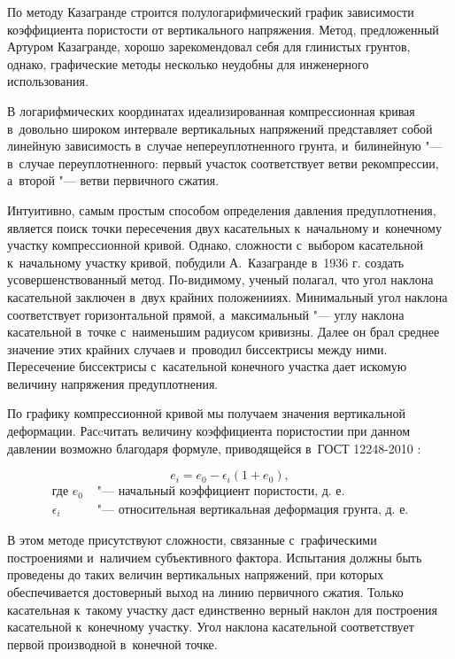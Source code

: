 По методу Казагранде строится полулогарифмический график зависимости коэффициента пористости от вертикального напряжения.  
Метод, предложенный Артуром Казагранде, хорошо зарекомендовал себя для глинистых грунтов, однако, графические методы несколько неудобны для инженерного использования.

В логарифмических координатах идеализированная компрессионная кривая в~довольно широком интервале вертикальных напряжений представляет собой линейную зависимость в~случае непереуплотненного грунта, и~билинейную "--- в~случае переуплотненного:
первый участок соответствует ветви рекомпрессии, а~второй "--- ветви первичного сжатия.

Интуитивно, самым простым способом определения давления предуплотнения, является поиск точки пересечения двух касательных к~начальному и~конечному участку компрессионной кривой. 
Однако, сложности с~выбором касательной к~начальному участку кривой, побудили А.~Казагранде в~1936 г. создать усовершенствованный метод. 
По-видимому, ученый полагал, что угол наклона касательной заключен в~двух крайних положенииях. 
Минимальный угол наклона соответствует горизонтальной прямой, а~максимальный "--- углу наклона касательной в~точке с~наименьшим радиусом кривизны. 
Далее он брал среднее значение этих крайних случаев и~проводил биссектрисы между ними. 
Пересечение биссектрисы с~касательной конечного участка дает искомую величину напряжения предуплотнения.

По графику компрессионной кривой мы получаем значения вертикальной деформации. Расcчитать величину коэффициента пористостии при данном давлении возможно благодаря формуле, приводящейся в~ГОСТ 12248-2010 \cite{gost12248}:

\begin{equation}
  \label{eq:void}
  e_i = e_0 - \epsilon_i (1+e_0),
\end{equation}
\begin{align*}
  \text{где }
  e_0 & 
  \text{ "--- начальный коэффициент пористости, д.~е.} \\
  \epsilon_i & 
  \text{ "--- относительная вертикальная деформация грунта, д.~е.}
\end{align*}


В этом методе присутствуют сложности, связанные с~графическими построениями и~наличием субъективного фактора.
Испытания должны быть проведены до таких величин вертикальных напряжений, при которых обеспечивается достоверный выход на линию первичного сжатия. 
Только касательная к~такому участку даст единственно верный наклон для построения касательной к~конечному участку.
Угол наклона касательной соответствует первой производной в~конечной точке.

